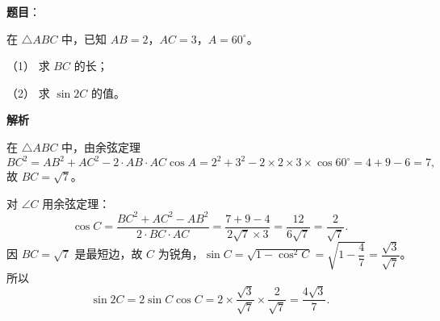 \begin{answer}

\textbf{题目}：

在 \(\triangle ABC\) 中，已知 \(AB=2\)，\(AC=3\)，\(A=60^{\circ}\)。

（1） 求 \(BC\) 的长；

（2） 求 \(\sin 2C\) 的值。

\textbf{解析}


在 \(\triangle ABC\) 中，由余弦定理
\nopagebreak[4]
\[
BC^{2}=AB^{2}+AC^{2}-2\cdot AB\cdot AC\cos A=2^{2}+3^{2}-2\times2\times3\times\cos60^{\circ}=4+9-6=7,
\]
故 \(BC=\sqrt{7}\)。


对 \(\angle C\) 用余弦定理：
\nopagebreak[4]
\[
\cos C=\frac{BC^{2}+AC^{2}-AB^{2}}{2\cdot BC\cdot AC}=\frac{7+9-4}{2\sqrt{7}\times3}=\frac{12}{6\sqrt{7}}=\frac{2}{\sqrt{7}}.
\]
因 \(BC=\sqrt{7}\) 是最短边，故 \(C\) 为锐角，\(\sin C=\sqrt{1-\cos^{2}C}=\sqrt{1-\dfrac{4}{7}}=\dfrac{\sqrt{3}}{\sqrt{7}}\)。所以
\nopagebreak[4]
\[
\sin2C=2\sin C\cos C=2\times\frac{\sqrt{3}}{\sqrt{7}}\times\frac{2}{\sqrt{7}}=\frac{4\sqrt{3}}{7}.
\]



\end{answer}
